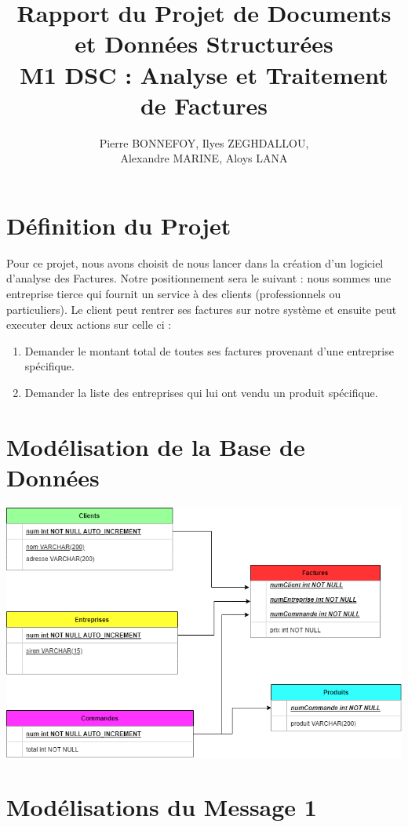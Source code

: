\documentclass[a4paper, 11pt]{article}
\title{Rapport du Projet de Documents et Données Structurées \\M1 DSC : Analyse et Traitement de Factures}
\author{Pierre BONNEFOY, Ilyes ZEGHDALLOU,\\ Alexandre MARINE, Aloys LANA}
\begin{document}
\maketitle
\newpage
\tableofcontents

\newpage
\section{Définition du Projet}
Pour ce projet, nous avons choisit de nous lancer dans la création d'un logiciel d'analyse des Factures. Notre positionnement sera le suivant : nous sommes une entreprise tierce qui fournit un service à des clients (professionnels ou particuliers). Le client peut rentrer ses factures sur notre système et ensuite peut executer deux actions sur celle ci :
\begin{enumerate}
    \item Demander le montant total de toutes ses factures provenant d'une entreprise spécifique.
    \item Demander la liste des entreprises qui lui ont vendu un produit spécifique.
\end{enumerate}

\section{Modélisation de la Base de Données}
    \begin{center}
    \includegraphics[scale=0.6]{schema_bdd.png}
    \end{center}

\section{Modélisations du Message 1}
\end{document}
